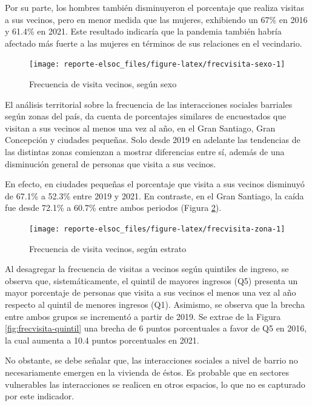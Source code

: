 \documentclass[
  12pt,
]{book}
\begin{document}
Por su parte, los hombres también disminuyeron el porcentaje que realiza visitas a sus vecinos, pero en menor medida que las mujeres, exhibiendo un 67\% en 2016 y 61.4\% en 2021. Este resultado indicaría que la pandemia también habría afectado más fuerte a las mujeres en términos de sus relaciones en el vecindario.

\begin{figure}

{\centering \texttt{[image: reporte-elsoc\_files/figure-latex/frecvisita-sexo-1]} 

}

\caption{Frecuencia de visita vecinos, según sexo}\label{fig:frecvisita-sexo}
\end{figure}

El análisis territorial sobre la frecuencia de las interacciones sociales barriales según zonas del país, da cuenta de porcentajes similares de encuestados que visitan a sus vecinos al menos una vez al año, en el Gran Santiago, Gran Concepción y ciudades pequeñas. Solo desde 2019 en adelante las tendencias de las distintas zonas comienzan a mostrar diferencias entre sí, además de una disminución general de personas que visita a sus vecinos.

En efecto, en ciudades pequeñas el porcentaje que visita a sus vecinos disminuyó de 67.1\% a 52.3\% entre 2019 y 2021. En contraste, en el Gran Santiago, la caída fue desde 72.1\% a 60.7\% entre ambos periodos (Figura \ref{fig:frecvisita-zona}).

\begin{figure}

{\centering \texttt{[image: reporte-elsoc\_files/figure-latex/frecvisita-zona-1]} 

}

\caption{Frecuencia de visita vecinos, según estrato}\label{fig:frecvisita-zona}
\end{figure}

Al desagregar la frecuencia de visitas a vecinos según quintiles de ingreso, se observa que, sistemáticamente, el quintil de mayores ingresos (Q5) presenta un mayor porcentaje de personas que visita a sus vecinos el menos una vez al año respecto al quintil de menores ingresos (Q1). Asimismo, se observa que la brecha entre ambos grupos se incrementó a partir de 2019. Se extrae de la Figura \ref{fig:frecvisita-quintil} una brecha de 6 puntos porcentuales a favor de Q5 en 2016, la cual aumenta a 10.4 puntos porcentuales en 2021.

No obstante, se debe señalar que, las interacciones sociales a nivel de barrio no necesariamente emergen en la vivienda de éstos. Es probable que en sectores vulnerables las interacciones se realicen en otros espacios, lo que no es capturado por este indicador.
\end{document}
